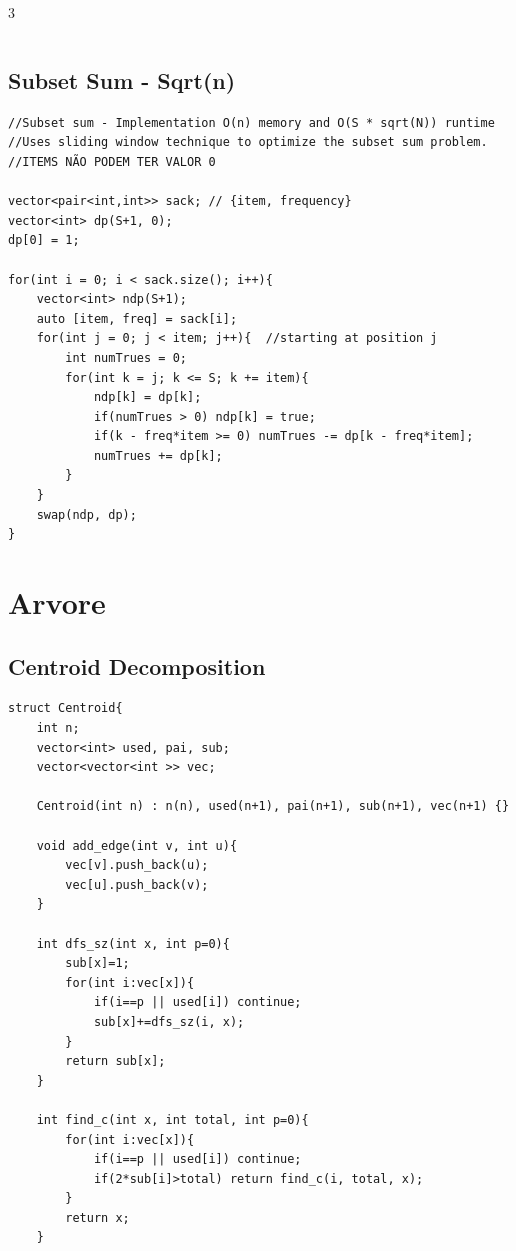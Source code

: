 \documentclass[9pt, a4paper, notitlepage]{extreport}
\begin{document}
\begin{multicols}{3}
\begin{verbatim}
\end{verbatim}

\subsection{Subset Sum - Sqrt(n)}
\begin{verbatim}
//Subset sum - Implementation O(n) memory and O(S * sqrt(N)) runtime
//Uses sliding window technique to optimize the subset sum problem.
//ITEMS NÃO PODEM TER VALOR 0

vector<pair<int,int>> sack; // {item, frequency}
vector<int> dp(S+1, 0);
dp[0] = 1;

for(int i = 0; i < sack.size(); i++){
    vector<int> ndp(S+1);
    auto [item, freq] = sack[i];
    for(int j = 0; j < item; j++){  //starting at position j
        int numTrues = 0;
        for(int k = j; k <= S; k += item){
            ndp[k] = dp[k];
            if(numTrues > 0) ndp[k] = true;
            if(k - freq*item >= 0) numTrues -= dp[k - freq*item];
            numTrues += dp[k];
        }
    }
    swap(ndp, dp);
}
\end{verbatim}



%
%

\section{Arvore}

\subsection{Centroid Decomposition}
\begin{verbatim}
struct Centroid{
    int n;
    vector<int> used, pai, sub;
    vector<vector<int >> vec;

    Centroid(int n) : n(n), used(n+1), pai(n+1), sub(n+1), vec(n+1) {}

    void add_edge(int v, int u){
        vec[v].push_back(u);
        vec[u].push_back(v);
    }

    int dfs_sz(int x, int p=0){
        sub[x]=1;
        for(int i:vec[x]){
            if(i==p || used[i]) continue;
            sub[x]+=dfs_sz(i, x);
        }
        return sub[x];
    }

    int find_c(int x, int total, int p=0){
        for(int i:vec[x]){
            if(i==p || used[i]) continue;
            if(2*sub[i]>total) return find_c(i, total, x);
        }
        return x;
    }
    

\end{verbatim}
\end{multicols}
\end{document}
